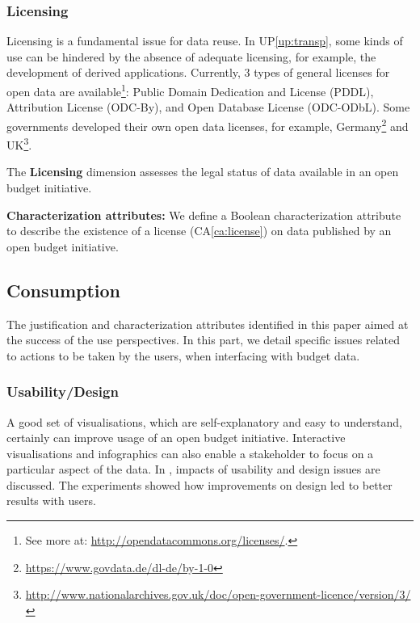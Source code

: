 \vspace{.1cm}
	\subsubsection{Licensing}
Licensing is a fundamental issue for data reuse. 
In UP\ref{up:transp}, some kinds of use can be hindered by the absence of adequate licensing, for example, the development of derived applications. 
Currently, 3 types of general licenses for open data are available\footnote{See more at: \url{http://opendatacommons.org/licenses/}.}: Public Domain Dedication and License (PDDL), Attribution License (ODC-By), and Open Database License (ODC-ODbL). Some governments developed their own open data licenses, for example, Germany\footnote{\url{https://www.govdata.de/dl-de/by-1-0}} and UK\footnote{\url{http://www.nationalarchives.gov.uk/doc/open-government-licence/version/3/}}.

		\begin{defn}The \textbf{Licensing} dimension assesses the legal status of data available in an open budget initiative.
		\end{defn}
		\noindent\textbf{Characterization attributes:}
We define a Boolean characterization attribute to describe the existence of a license (CA\ref{ca:license}) on data published by an open budget initiative.

\subsection{Consumption}
The justification and characterization attributes identified in this paper aimed at the success of the use perspectives.
In this part, we detail specific issues related to actions to be taken by the users, when interfacing with budget data. 

\vspace{.1cm}
	\subsubsection{Usability/Design}


A good set of visualisations, which are self-explanatory and easy to understand, certainly can improve usage of an open budget initiative.
Interactive visualisations and infographics can also enable a stakeholder to focus on a particular aspect of the data.
In \cite{Walker2010}, impacts of usability and design issues are discussed. The experiments showed how improvements on design led to better results with users.

